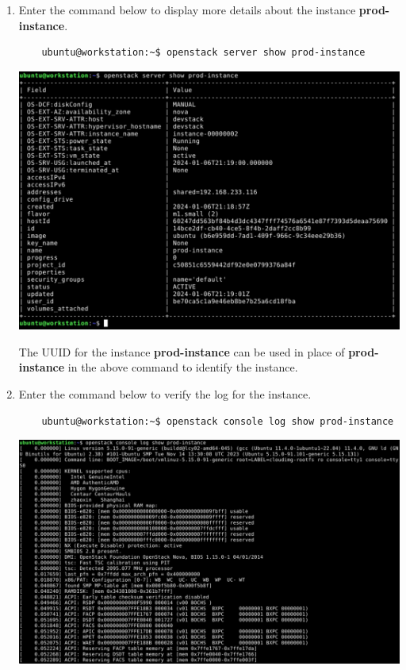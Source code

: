 \documentclass[letterpaper, 12pt]{article}
\begin{document}
\begin{enumerate}
    \item Enter the command below to display more details about the instance \textbf{prod-instance}.
    \begin{lstlisting}
    ubuntu@workstation:~$ openstack server show prod-instance
    \end{lstlisting}

    \begin{center}
        \includegraphics[width=\linewidth]{images/part2/step13.png}
    \end{center}

    \begin{tipbox}
        The UUID for the instance \textbf{prod-instance} can be used in place of \textbf{prod-instance} in the above
        command to identify the instance.
    \end{tipbox}

    \item Enter the command below to verify the log for the instance.
    \begin{lstlisting}
    ubuntu@workstation:~$ openstack console log show prod-instance
    \end{lstlisting}

    \begin{center}
        \includegraphics[width=\linewidth]{images/part2/step14.png}
    \end{center}


\end{enumerate}
\end{document}
